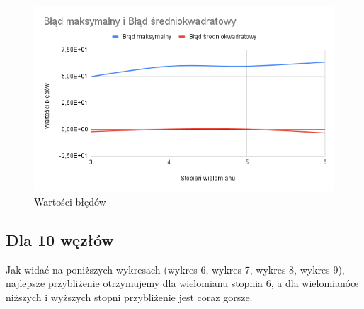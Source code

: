 \documentclass{article}
\begin{document}
\begin{figure}[H]
  \centering
  \begin{minipage}[b]{0.4\textwidth}
    \includegraphics[width=\textwidth]{img05.png}
    \caption{Wartości błędów}
  \end{minipage}
\end{figure}

\newpage

\subsection{Dla 10 węzłów}

\noindent
Jak widać na poniższych wykresach (wykres 6, wykres 7, wykres 8, wykres 9), najlepsze przybliżenie otrzymujemy dla wielomianu stopnia 6, a dla wielomianóœ niższych i wyższych stopni przybliżenie jest coraz gorsze.
\end{document}
